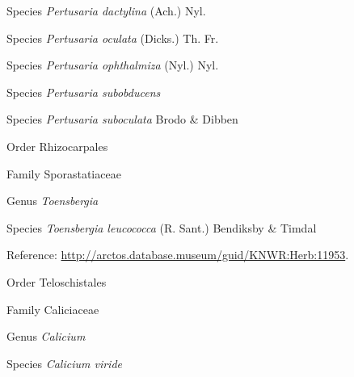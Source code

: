 \documentclass[9pt, article]{memoir}
\begin{document}
\begin{multicols}{2}
\vspace{6pt}\noindent\hspace{36pt}Species \textit{Pertusaria dactylina} (Ach.) Nyl.


\vspace{6pt}\noindent\hspace{36pt}Species \textit{Pertusaria oculata} (Dicks.) Th. Fr.


\vspace{6pt}\noindent\hspace{36pt}Species \textit{Pertusaria ophthalmiza} (Nyl.) Nyl.


\vspace{6pt}\noindent\hspace{36pt}Species \textit{Pertusaria subobducens}


\vspace{6pt}\noindent\hspace{36pt}Species \textit{Pertusaria suboculata} Brodo \& Dibben


\vspace{6pt}\noindent\hspace{18pt}Order Rhizocarpales


\vspace{6pt}\noindent\hspace{24pt}Family Sporastatiaceae


\vspace{6pt}\noindent\hspace{30pt}Genus \textit{Toensbergia}


\vspace{6pt}\noindent\hspace{36pt}Species \textit{Toensbergia leucococca} (R. Sant.) Bendiksby \& Timdal


\vspace{6pt}Reference: 
\url{http://arctos.database.museum/guid/KNWR:Herb:11953}.

\vspace{6pt}\noindent\hspace{18pt}Order Teloschistales


\vspace{6pt}\noindent\hspace{24pt}Family Caliciaceae


\vspace{6pt}\noindent\hspace{30pt}Genus \textit{Calicium}


\vspace{6pt}\noindent\hspace{36pt}Species \textit{Calicium viride}



\end{multicols}
\end{document}

